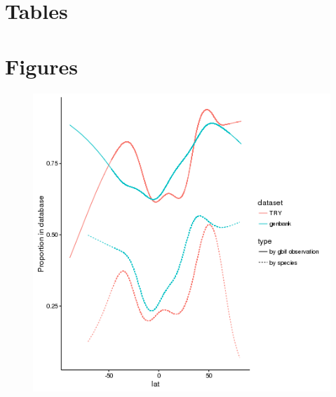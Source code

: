 \documentclass[a4paper,11pt]{article}
\begin{document}
\section{Tables}









\section{Figures}

\begin{figure}[h!]
\centering
  \includegraphics[width=\textwidth]{figures/multi_gam.png}
   \label{fig:genbank_try_gam}
\end{figure}
\end{document}
